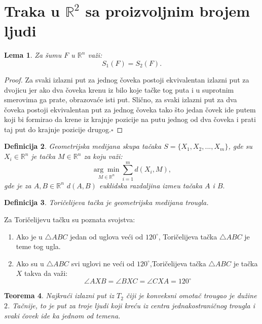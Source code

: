 \documentclass[11pt,letter]{article}
\newtheorem{teo}{\bf Teorema}[section]
\newtheorem{lem}[teo]{\bf Lema}
\newtheorem{df}[teo]{\bf Definicija}
\newcommand{\qed}{\hfill $\square$ \bigskip}
\begin{document}
\section[Traka u $\mathbb{R}^2$ sa proizvoljnim brojem ljudi]{Traka u $\mathbb{R}^2$ sa proizvoljnim brojem ljudi}
\bigskip
\begin{lem} Za \v sumu $F$ u $\mathbb{R}^n$ va\v zi: $$S_1(F)=S_2(F).$$\end{lem}

\begin{proof}Za svaki izlazni put za jednog \v coveka postoji ekvivalentan izlazni put za dvojicu jer ako dva \v coveka krenu iz bilo koje ta\v cke tog puta i u suprotnim smerovima ga prate, obrazova\' ce isti put. Sli\v cno, za svaki izlazni put za dva \v coveka postoji ekvivalentan put za jednog \v coveka tako \v sto jedan \v covek ide putem koji bi formirao da krene iz krajnje pozicije na putu jednog od dva \v coveka i prati taj put do krajnje pozicije drugog.\qed
\end{proof}
\begin{df} Geometrijska medijana skupa ta\v caka $S=\{ X_1, X_2, ..., X_m\}$, gde su $X_i\in \mathbb{R}^n$ je ta\v cka $M\in \mathbb{R}^n$ za koju va\v zi:
$$\underset{M\in \mathbb{R}^n}{\arg\min} \sum^m_{i=1}{d(X_i, M)}, $$
gde je za $A,B\in \mathbb{R}^n$ $d(A, B)$ euklidska razdaljina izme\dj u ta\v caka $A$ i $B.$\end{df}
\begin{df} Tori\v celijeva ta\v cka je geometrijska medijana trougla. \end{df}
\indent Za Tori\v celijevu ta\v cku su poznata svojstva:
\begin{enumerate}
\item Ako je u $\bigtriangleup ABC$ jedan od uglova ve\' ci od $120^\circ$, Tori\v celijeva ta\v cka $\bigtriangleup ABC$ je teme tog ugla.
\item Ako su u $\bigtriangleup ABC$ svi uglovi ne ve\' ci od $120^\circ$,Tori\v celijeva ta\v cka $\bigtriangleup ABC$ je ta\v cka $X$ takva da va\v zi:
$$\angle AXB=\angle BXC= \angle CXA=120^\circ$$
\end{enumerate}


\begin{teo} Najkra\' ci izlazni put iz $T_2$ \v ciji je konveksni omota\v c trougao je du\v zine $2$. Ta\v cnije, to je put za troje ljudi koji kre\' cu iz centra jednakostrani\v cnog trougla i svaki \v covek ide ka jednom od temena.
\end{teo}
\end{document}
